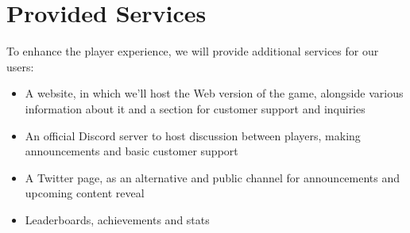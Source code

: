 \section{Provided Services}

To enhance the player experience, we will provide additional services for our users:

\begin{itemize}
	\item A website, in which we'll host the Web version of the game, alongside various information about it and a section for customer support and inquiries
	\item An official Discord server to host discussion between players, making announcements and basic customer support
	\item A Twitter page, as an alternative and public channel for announcements and upcoming content reveal
	\item Leaderboards, achievements and stats
\end{itemize}

\pagebreak 